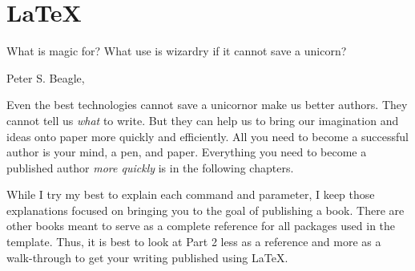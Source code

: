 


\part{LaTeX}\label{latex:prt}

\begin{myquotation}What is magic for? What use is wizardry if it cannot save a unicorn?\par\mbox{}\hfill\emdash{}Peter S. Beagle, \ifxetex\label{beagle-heroes-quote}\else~\citep[cf. p.~187f]{lastunicorn2}\fi\end{myquotation}

Even the best technologies cannot save a unicorn\emdash{}or make us better authors. They cannot tell us \textit{what} to write. But they can help us to bring our imagination and ideas onto paper more quickly and efficiently. All you need to become a successful author is your mind, a pen, and paper. Everything you need to become a published author \textit{more quickly} is in the following chapters.

While I try my best to explain each command and parameter, I keep those explanations focused on bringing you to the goal of publishing a book. There are other books meant to serve as a complete reference for all packages used in the template. Thus, it is best to look at Part 2 less as a reference and more as a walk-through to get your writing published using LaTeX.